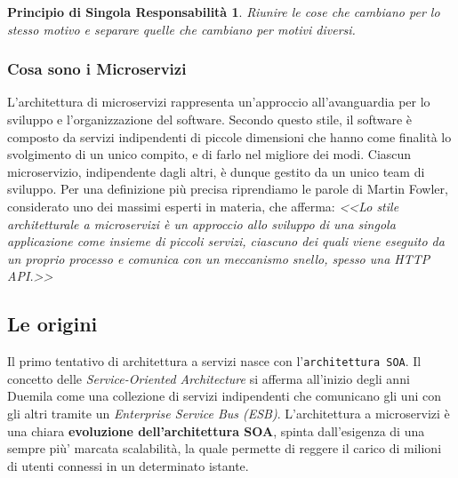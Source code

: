 \newtheorem*{defin1}{Principio di Singola Responsabilità}
\begin{defin1}
    Riunire le cose che cambiano per lo stesso motivo e separare quelle che cambiano per motivi diversi.
\end{defin1}

\subsubsection{Cosa sono i Microservizi}
L'architettura di microservizi rappresenta un'approccio all'avanguardia per lo sviluppo e l'organizzazione del software. Secondo questo stile, il software è composto da servizi indipendenti di piccole dimensioni che hanno come finalità lo svolgimento di un unico compito, e di farlo nel migliore dei modi. \cite{amazon:microservices} Ciascun microservizio, indipendente dagli altri, è dunque gestito da un unico team di sviluppo. Per una definizione più precisa riprendiamo le parole di Martin Fowler, considerato uno dei massimi esperti in materia, che afferma: \textit{<<Lo stile architetturale a microservizi è un approccio allo sviluppo di una singola applicazione come insieme di piccoli servizi, ciascuno dei quali viene eseguito da un proprio processo e comunica con un meccanismo snello, spesso una HTTP API.>>} \cite{fowler:microservices}

\subsection{Le origini}
Il primo tentativo di architettura a servizi nasce con l’\texttt{architettura SOA}. Il concetto delle \textit{Service-Oriented Architecture} si afferma all’inizio degli anni Duemila come una collezione di servizi indipendenti che comunicano gli uni con gli altri tramite un \textit{Enterprise Service Bus (ESB)}. L’architettura a microservizi è una chiara \textbf{evoluzione dell’architettura SOA}, spinta dall’esigenza  di una sempre più’ marcata scalabilità, la quale permette di reggere il carico di milioni di utenti connessi in un determinato istante.

